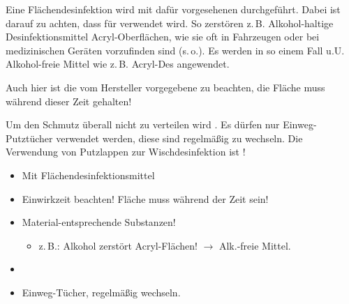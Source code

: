{
Eine Flächendesinfektion wird mit dafür vorgesehenen
 durchgeführt. Dabei ist darauf zu achten, dass
für  verwendet wird. So zerstören z.\,B.
Alkohol-haltige Desinfektionsmittel Acryl-Oberflächen, wie sie oft in
Fahrzeugen oder bei medizinischen Geräten vorzufinden sind (s.\,o.). Es werden
in so einem Fall u.U. Alkohol-freie Mittel wie z.\,B. Acryl-Des{\texttrademark}
angewendet. 

Auch hier ist die vom Hersteller vorgegebene  zu beachten, die
Fläche muss während dieser Zeit  gehalten! 

Um den Schmutz überall nicht zu verteilen wird . Es dürfen nur Einweg-Putztücher verwendet
werden, diese sind regelmäßig zu wechseln. Die Verwendung von Putzlappen zur
Wischdesinfektion ist !


}{
\begin{itemize}
  \item Mit Flächendesinfektionsmittel
  \item Einwirkzeit beachten! Fläche muss während der Zeit  sein!
  \item Material-entsprechende Substanzen!
  \begin{itemize}
    \item z.\,B.: Alkohol zerstört Acryl-Flächen! ${\rightarrow}$
    Alk.-freie Mittel.
  \end{itemize}
  \item {}
  \item Einweg-Tücher, regelmäßig wechseln.
\end{itemize}
}{}{}{}


